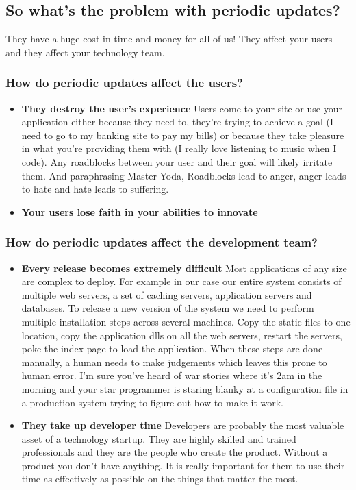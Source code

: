 \documentclass{article}
\begin{document}
\subsection{So what's the problem with periodic updates?}

They have a huge cost in time and money for all of us!
%
They affect your users and they affect your technology team.

\subsubsection*{How do periodic updates affect the users?}
\begin{itemize}
  \item \textbf{They destroy the user's experience}
%
Users come to your site or use your application either because they
need to, they're trying to achieve a goal (I need to go to my banking
site to pay my bills) or because they take pleasure in what you're
providing them with (I really love listening to music when I code).
%
Any roadblocks between your user and their goal will likely irritate
them.
%
And paraphrasing Master Yoda, Roadblocks lead to anger, anger leads to
hate and hate leads to suffering.
%
  \item \textbf{Your users lose faith in your abilities to innovate}
%

\end{itemize}

\subsubsection*{How do periodic updates affect the development team?}
\begin{itemize}
  \item \textbf{Every release becomes extremely difficult}
%
Most applications of any size are complex to deploy.
%
For example in our case our entire system consists of multiple web
servers, a set of caching servers, application servers and databases.
%
To release a new version of the system we need to perform multiple
installation steps across several machines.
%
Copy the static files to one location, copy the application dlls on
all the web servers, restart the servers, poke the index page to load
the application.
%
When these steps are done manually, a human needs to make judgements
which leaves this prone to human error.
%
I'm sure you've heard of war stories where it's 2am in the morning and
your star programmer is staring blanky at a configuration file in a
production system trying to figure out how to make it work.
%
  \item \textbf{They take up developer time}
%
Developers are probably the most valuable asset of a technology
startup.
%
They are highly skilled and trained professionals and they are the
people who create the product.
%
Without a product you don't have anything.
%
It is really important for them to use their time as effectively as
possible on the things that matter the most.
%
\end{itemize}
\end{document}
